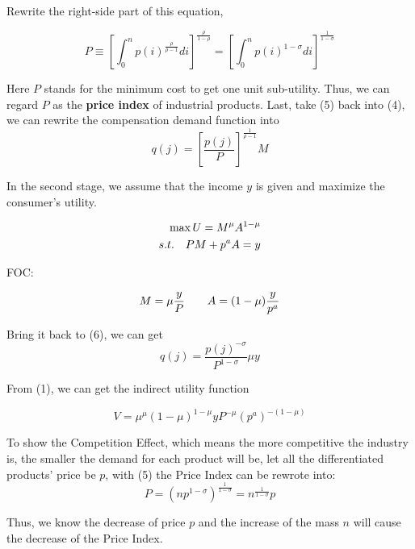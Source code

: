 \documentclass{article}
\begin{document}
Rewrite the right-side part of this equation, 

\begin{equation}
    P \equiv [\int_0^n p(i)^{\frac{\rho}{\rho -1}}di]^{\frac{\rho}{1-\rho}} = 
    [\int_0^n p(i)^{1-\sigma}di]^{\frac{1}{1-\sigma}}
\end{equation}

Here $P$ stands for the minimum cost to get one unit sub-utility. Thus, we can regard $P$ as the \textbf{price index} of industrial products. Last, take (5) back into (4), we can rewrite the compensation demand function into 
\begin{equation}
    q(j) = [\frac{p(j)}{P}]^{\frac{1}{\rho -1}}M
\end{equation}

In the second stage, we assume that the income $y$ is given and maximize the consumer's utility.

\begin{equation}
    \notag
    \begin{aligned}
     \max U = M^{\mu} A ^{1-\mu}\\
    s. t. \quad PM+p^aA = y
    \end{aligned}
\end{equation}

FOC:

\begin{equation}
    \notag
    M=\mu \frac{y}{P} \qquad A = (1-\mu ) \frac{y}{p^a}
\end{equation}

Bring it back to (6), we can get 
\begin{equation}
    q(j)= \frac{p(j)^{-\sigma}}{P^{1-\sigma}}\mu y
\end{equation}

From (1), we can get the indirect utility function 

\begin{equation}
    V= \mu^{\mu} (1- \mu)^{1-\mu} y P^{-\mu} (p^a)^{-(1-\mu)}
\end{equation}

To show the Competition Effect, which means the more competitive the industry is, the smaller the demand for each product will be, let all the differentiated products' price be $p$, with (5) the Price Index can be rewrote into:
$$P = (np^{1-\sigma})^{\frac{1}{1-\sigma}} =  n^{\frac{1}{1-\sigma}}p$$

Thus, we know the decrease of price $p$ and the increase of the mass $n$ will cause the decrease of the Price Index.
\end{document}
